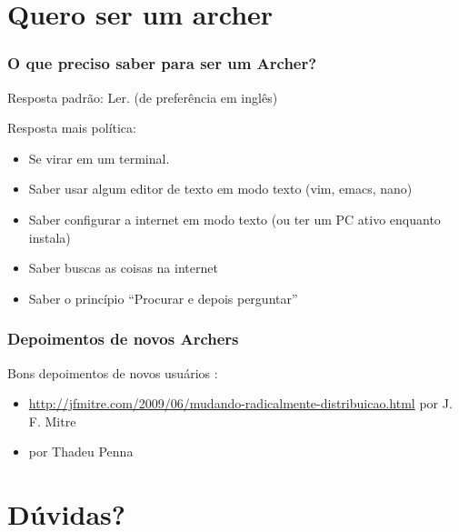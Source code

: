 \documentclass{beamer}
\begin{document}
\section{Quero ser um archer }
    
\begin{frame}
    \frametitle{O que preciso saber para ser um Archer?}
    \begin{block}{Resposta padrão:}
        Ler. (de preferência em inglês)
    \end{block}
    \begin{block}{Resposta mais política:}
        \begin{itemize}
            \item Se virar em um terminal. 
            \item Saber usar algum editor de texto em modo texto (vim, emacs, nano) 
            \item Saber configurar a internet em modo texto (ou ter um PC ativo enquanto instala)
            \item Saber buscas as coisas na internet
            \item Saber o princípio ``Procurar e depois perguntar''
        \end{itemize}
    \end{block}
\end{frame}

\begin{frame}
        \frametitle{Depoimentos de novos Archers}
        \begin{block}{Bons depoimentos de novos usuários :}
            \begin{itemize}
                \item \url{http://jfmitre.com/2009/06/mudando-radicalmente-distribuicao.html} por J. F. Mitre
                \item por Thadeu Penna
            \end{itemize}
        \end{block}
\end{frame}


\section{Dúvidas?}
\end{document}
